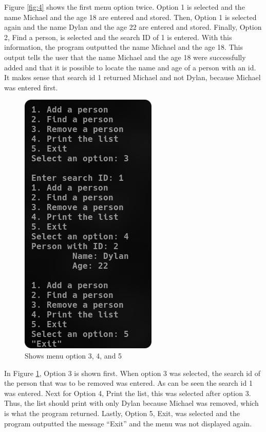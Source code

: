 \documentclass[
	letterpaper, %
	10pt, %
]{CSUniSchoolLabReport}
\begin{document}
Figure \ref{fig:4} shows the first menu option twice. Option 1 is selected and the name Michael and the age 18 are entered and stored. Then, Option 1 is selected again and the name Dylan and the age 22 are entered and stored. Finally, Option 2, Find a person, is selected and the search ID of 1 is entered. With this information, the program outputted the name Michael and the age 18. This output tells the user that the name Michael and the age 18 were successfully added and that it is possible to locate the name and age of a person with an id. It makes sense that search id 1 returned Michael and not Dylan, because Michael was entered first. 

\begin{figure}[H]
  \centering
  \includegraphics{Figures/Assign3-2.png}
  \caption{Shows menu option 3, 4, and 5}
  \label{fig:5}
\end{figure}

In Figure \ref{fig:5}, Option 3 is shown first. When option 3 was selected, the search id of the person that was to be removed was entered. As can be seen the search id 1 was entered. Next for Option 4, Print the list, this was selected after option 3. Thus, the list should print with only Dylan because Michael was removed, which is what the program returned. Lastly, Option 5, Exit, was selected and the program outputted the message “Exit” and the menu was not displayed again. 
\end{document}
